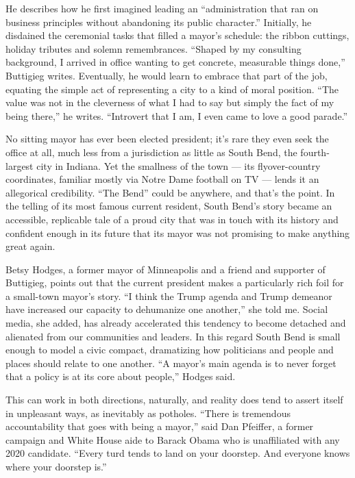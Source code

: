 He describes how he first imagined leading an ``administration that ran
on business principles without abandoning its public character.''
Initially, he disdained the ceremonial tasks that filled a mayor's
schedule: the ribbon cuttings, holiday tributes and solemn remembrances.
``Shaped by my consulting background, I arrived in office wanting to get
concrete, measurable things done,'' Buttigieg writes. Eventually, he
would learn to embrace that part of the job, equating the simple act of
representing a city to a kind of moral position. ``The value was not in
the cleverness of what I had to say but simply the fact of my being
there,'' he writes. ``Introvert that I am, I even came to love a good
parade.''

No sitting mayor has ever been elected president; it's rare they even
seek the office at all, much less from a jurisdiction as little as South
Bend, the fourth-largest city in Indiana. Yet the smallness of the town
--- its flyover-country coordinates, familiar mostly via Notre Dame
football on TV --- lends it an allegorical credibility. ``The Bend''
could be anywhere, and that's the point. In the telling of its most
famous current resident, South Bend's story became an accessible,
replicable tale of a proud city that was in touch with its history and
confident enough in its future that its mayor was not promising to make
anything great again.

Betsy Hodges, a former mayor of Minneapolis and a friend and supporter
of Buttigieg, points out that the current president makes a particularly
rich foil for a small-town mayor's story. ``I think the Trump agenda and
Trump demeanor have increased our capacity to dehumanize one another,''
she told me. Social media, she added, has already accelerated this
tendency to become detached and alienated from our communities and
leaders. In this regard South Bend is small enough to model a civic
compact, dramatizing how politicians and people and places should relate
to one another. ``A mayor's main agenda is to never forget that a policy
is at its core about people,'' Hodges said.

This can work in both directions, naturally, and reality does tend to
assert itself in unpleasant ways, as inevitably as potholes. ``There is
tremendous accountability that goes with being a mayor,'' said Dan
Pfeiffer, a former campaign and White House aide to Barack Obama who is
unaffiliated with any 2020 candidate. ``Every turd tends to land on your
doorstep. And everyone knows where your doorstep is.''

